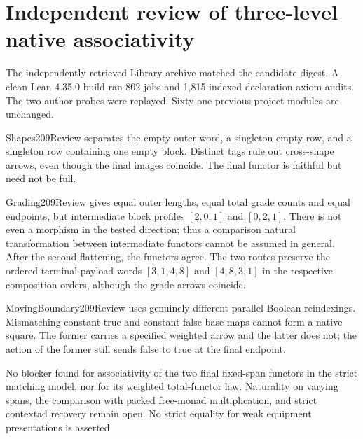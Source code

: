 \documentclass{article}
\begin{document}
\section*{Independent review of three-level native associativity}
The independently retrieved Library archive matched the candidate digest. A clean Lean 4.35.0 build ran 802 jobs and 1,815 indexed declaration axiom audits. The two author probes were replayed. Sixty-one previous project modules are unchanged.
\par Shapes209Review separates the empty outer word, a singleton empty row, and a singleton row containing one empty block. Distinct tags rule out cross-shape arrows, even though the final images coincide. The final functor is faithful but need not be full.
\par Grading209Review gives equal outer lengths, equal total grade counts and equal endpoints, but intermediate block profiles $[2,0,1]$ and $[0,2,1]$. There is not even a morphism in the tested direction; thus a comparison natural transformation between intermediate functors cannot be assumed in general. After the second flattening, the functors agree. The two routes preserve the ordered terminal-payload words $[3,1,4,8]$ and $[4,8,3,1]$ in the respective composition orders, although the grade arrows coincide.
\par MovingBoundary209Review uses genuinely different parallel Boolean reindexings. Mismatching constant-true and constant-false base maps cannot form a native square. The former carries a specified weighted arrow and the latter does not; the action of the former still sends false to true at the final endpoint.
\par No blocker found for associativity of the two final fixed-span functors in the strict matching model, nor for its weighted total-functor law. Naturality on varying spans, the comparison with packed free-monad multiplication, and strict contextad recovery remain open. No strict equality for weak equipment presentations is asserted.
\end{document}

